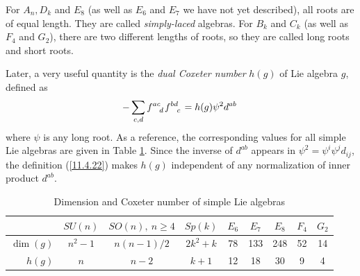 For $A_{n}, D_{k}$ and $E_{8}$ (as well as $E_{6}$ and $E_{7}$ we have not yet described), all roots are of equal length. They are called \emph{simply-laced} algebras. For $B_{k}$ and $C_{k}$ (as well as $F_{4}$ and $G_{2}$), there are two different lengths of roots, so they are called long roots and short roots.

Later, a very useful quantity is the \emph{dual Coxeter number} $h(g)$ of Lie algebra $g$, defined as
\begin{equation}
	-\sum_{c,d} f\indices{^a^c_d}f\indices{^b^d_c}=h(g)\psi^{2}d^{ab} \: \label{11.4.22}
\end{equation}
where $\psi$ is any long root. As a reference, the corresponding values for all simple Lie algebras are given in Table \ref{tab:11.3}. Since the inverse of $d^{ab}$ appears in $\psi^{2}=\psi^{i}\psi^{j}d_{ij}$, the definition (\ref{11.4.22}) makes $h(g)$ independent of any normalization of inner product $d^{ab}$.

\begin{table}[h]
	\caption{Dimension and Coxeter number of simple Lie algebras}
	\label{tab:11.3}%
	\centering
	\begin{tabular}[c]{rcccccccc}
		\hline\hline
		\quad\vphantom{\Big(} & $SU(n)$ &  $SO(n),\:n\geq 4$ & $Sp(k)$ & $E_{6}$ & $E_{7}$ & $E_{8}$ & $F_{4}$ & $G_{2}$  \\
		\hline
		$\overset{}{\operatorname{dim}(g)}$ & $n^{2}-1$ & $n(n-1)/2$ & $2k^{2}+k$ & 78 & 133 & 248 & 52 &14 \\
		$h(g)$ & $n$ & $n-2$ & $k+1$ & 12 & 18 & 30 & 9 & 4 \\
		\hline\hline
	\end{tabular}
\end{table}


